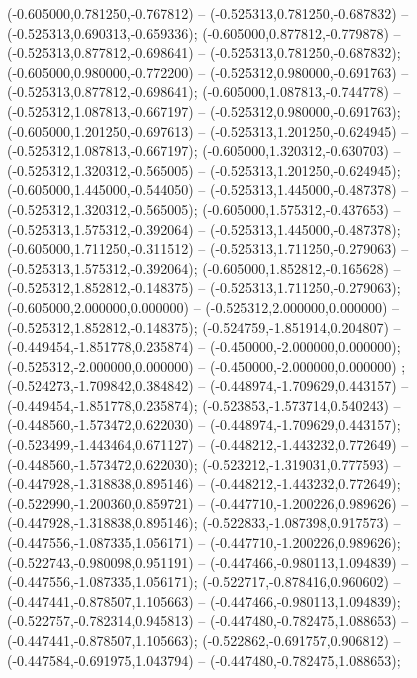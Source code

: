  (-0.605000,0.781250,-0.767812) -- (-0.525313,0.781250,-0.687832) -- (-0.525313,0.690313,-0.659336);
 (-0.605000,0.877812,-0.779878) -- (-0.525313,0.877812,-0.698641) -- (-0.525313,0.781250,-0.687832);
 (-0.605000,0.980000,-0.772200) -- (-0.525312,0.980000,-0.691763) -- (-0.525313,0.877812,-0.698641);
 (-0.605000,1.087813,-0.744778) -- (-0.525312,1.087813,-0.667197) -- (-0.525312,0.980000,-0.691763);
 (-0.605000,1.201250,-0.697613) -- (-0.525313,1.201250,-0.624945) -- (-0.525312,1.087813,-0.667197);
 (-0.605000,1.320312,-0.630703) -- (-0.525312,1.320312,-0.565005) -- (-0.525313,1.201250,-0.624945);
 (-0.605000,1.445000,-0.544050) -- (-0.525313,1.445000,-0.487378) -- (-0.525312,1.320312,-0.565005);
 (-0.605000,1.575312,-0.437653) -- (-0.525313,1.575312,-0.392064) -- (-0.525313,1.445000,-0.487378);
 (-0.605000,1.711250,-0.311512) -- (-0.525313,1.711250,-0.279063) -- (-0.525313,1.575312,-0.392064);
 (-0.605000,1.852812,-0.165628) -- (-0.525312,1.852812,-0.148375) -- (-0.525313,1.711250,-0.279063);
 (-0.605000,2.000000,0.000000) -- (-0.525312,2.000000,0.000000) -- (-0.525312,1.852812,-0.148375);
 (-0.524759,-1.851914,0.204807) -- (-0.449454,-1.851778,0.235874) -- (-0.450000,-2.000000,0.000000);
 (-0.525312,-2.000000,0.000000) -- (-0.450000,-2.000000,0.000000) ;
 (-0.524273,-1.709842,0.384842) -- (-0.448974,-1.709629,0.443157) -- (-0.449454,-1.851778,0.235874);
 (-0.523853,-1.573714,0.540243) -- (-0.448560,-1.573472,0.622030) -- (-0.448974,-1.709629,0.443157);
 (-0.523499,-1.443464,0.671127) -- (-0.448212,-1.443232,0.772649) -- (-0.448560,-1.573472,0.622030);
 (-0.523212,-1.319031,0.777593) -- (-0.447928,-1.318838,0.895146) -- (-0.448212,-1.443232,0.772649);
 (-0.522990,-1.200360,0.859721) -- (-0.447710,-1.200226,0.989626) -- (-0.447928,-1.318838,0.895146);
 (-0.522833,-1.087398,0.917573) -- (-0.447556,-1.087335,1.056171) -- (-0.447710,-1.200226,0.989626);
 (-0.522743,-0.980098,0.951191) -- (-0.447466,-0.980113,1.094839) -- (-0.447556,-1.087335,1.056171);
 (-0.522717,-0.878416,0.960602) -- (-0.447441,-0.878507,1.105663) -- (-0.447466,-0.980113,1.094839);
 (-0.522757,-0.782314,0.945813) -- (-0.447480,-0.782475,1.088653) -- (-0.447441,-0.878507,1.105663);
 (-0.522862,-0.691757,0.906812) -- (-0.447584,-0.691975,1.043794) -- (-0.447480,-0.782475,1.088653);
